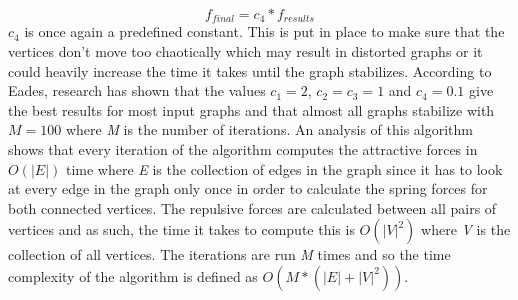 \documentclass[a4paper,12pt]{article}
\begin{document}
\begin{equation}\label{e:damper}
f_{final} = c_4 * f_{results}
\end{equation}
$c_4$ is once again a predefined constant. This is put in place to make sure that the vertices don't move too chaotically which may result in distorted graphs or it could heavily increase the time it takes until the graph stabilizes.
\newline
According to Eades, research has shown that the values $c_1=2$, $c_2=c_3=1$ and $c_4=0.1$ give the best results for most input graphs and that almost all graphs stabilize with $M=100$ where \emph{M} is the number of iterations.
\newline
An analysis of this algorithm shows that every iteration of the algorithm computes the attractive forces in $O(|E|)$ time where \emph{E} is the collection of edges in the graph since it has to look at every edge in the graph only once in order to calculate the spring forces for both connected vertices. The repulsive forces are calculated between all pairs of vertices and as such, the time it takes to compute this is $O(|V|^2)$ where \emph{V} is the collection of all vertices. The iterations are run \emph{M} times and so the time complexity of the algorithm is defined as $O(M*(|E| + |V|^2))$.
\end{document}
